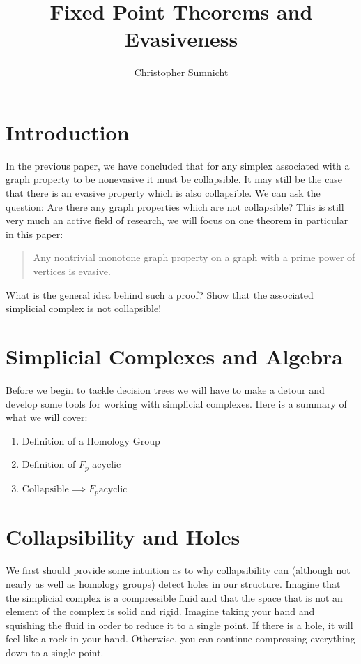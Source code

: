 \documentclass[letterpaper,12pt]{article}
\begin{document}
\title{Fixed Point Theorems and Evasiveness}
\author{Christopher Sumnicht}
\maketitle

\section{Introduction}

In the previous paper, we have concluded that for any simplex associated with a graph property to be nonevasive it must be collapsible. It may still be the case that there is an evasive property which is also collapsible. We can ask the question: Are there any graph properties which are not collapsible? This is still very much an active field of research, we will focus on one theorem in particular in this paper:

\begin{quote}
    Any nontrivial monotone graph property on a graph with a prime power of vertices is evasive.
\end{quote}

What is the general idea behind such a proof? Show that the associated simplicial complex is not collapsible!

\section{Simplicial Complexes and Algebra}

Before we begin to tackle decision trees we will have to make a detour and develop some tools for working with simplicial complexes. Here is a summary of what we will cover:

\begin{enumerate}
    \item{
            Definition of a Homology Group
        }
    \item{
            Definition of $F_p$ acyclic
        }
    \item{
            $\text{Collapsible} \implies F_p  \text{acyclic}$
        }
\end{enumerate}

\section{Collapsibility and Holes}

We first should provide some intuition as to why collapsibility can (although not nearly as well as homology groups) detect holes in our structure. Imagine that the simplicial complex is a compressible fluid and that the space that is not an element of the complex is solid and rigid. Imagine taking your hand and squishing the fluid in order to reduce it to a single point. If there is a hole, it will feel like a rock in your hand. Otherwise, you can continue compressing everything down to a single point.
\end{document}
